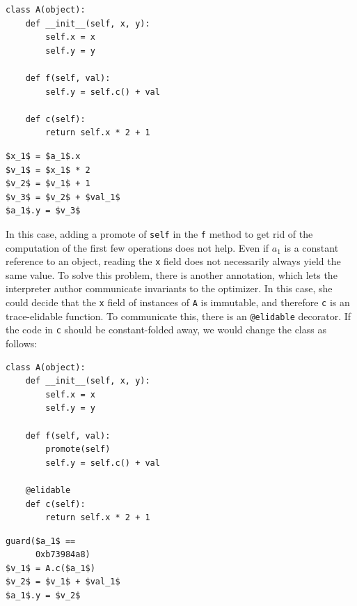 \documentclass[preprint]{sigplanconf}
\begin{document}
\begin{minipage}[t]{0.6\linewidth}
\centering
\begin{lstlisting}[mathescape,basicstyle=\ttfamily]
class A(object):
    def __init__(self, x, y):
        self.x = x
        self.y = y

    def f(self, val):
        self.y = self.c() + val

    def c(self):
        return self.x * 2 + 1
\end{lstlisting}
\end{minipage}
\vline
\hspace{0.5cm}
\begin{minipage}[t]{0.4\linewidth}
\begin{lstlisting}[mathescape,basicstyle=\ttfamily]
$x_1$ = $a_1$.x
$v_1$ = $x_1$ * 2
$v_2$ = $v_1$ + 1
$v_3$ = $v_2$ + $val_1$
$a_1$.y = $v_3$
\end{lstlisting}
\end{minipage}

In this case, adding a promote of \texttt{self} in the \texttt{f} method to get rid of the
computation of the first few operations does not help. Even if $a_1$ is a
constant reference to an object, reading the \texttt{x} field does not necessarily
always yield the same value. To solve this problem, there is another annotation,
which lets the interpreter author communicate invariants to the optimizer. In
this case, she could decide that the \texttt{x} field of instances of \texttt{A} is
immutable, and therefore \texttt{c}
is an trace-elidable function. To communicate this, there is an \texttt{@elidable} decorator.
If the code in \texttt{c} should be constant-folded away, we would change the
class as follows:

\begin{minipage}[t]{0.6\linewidth}
\centering
\begin{lstlisting}[mathescape,basicstyle=\ttfamily]
class A(object):
    def __init__(self, x, y):
        self.x = x
        self.y = y

    def f(self, val):
        promote(self)
        self.y = self.c() + val

    @elidable
    def c(self):
        return self.x * 2 + 1
\end{lstlisting}
\end{minipage}
\vline
\hspace{0.4cm}
\begin{minipage}[t]{0.4\linewidth}
\begin{lstlisting}[mathescape,basicstyle=\ttfamily]
guard($a_1$ == 
      0xb73984a8)
$v_1$ = A.c($a_1$)
$v_2$ = $v_1$ + $val_1$
$a_1$.y = $v_2$
\end{lstlisting}
\end{minipage}
\end{document}
